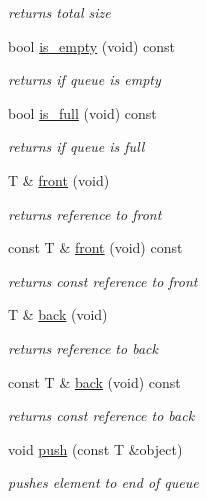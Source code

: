 \begin{DoxyCompactItemize}
\begin{DoxyCompactList}\small\item\em returns total size \end{DoxyCompactList}\item 
bool \hyperlink{classcrap_1_1static__queue_a6c20ede09aa3faca8849e97ec69b72b1}{is\-\_\-empty} (void) const 
\begin{DoxyCompactList}\small\item\em returns if queue is empty \end{DoxyCompactList}\item 
bool \hyperlink{classcrap_1_1static__queue_a4b27921670bf0540ab503043294b5c91}{is\-\_\-full} (void) const 
\begin{DoxyCompactList}\small\item\em returns if queue is full \end{DoxyCompactList}\item 
T \& \hyperlink{classcrap_1_1static__queue_ad2e008517715ad74b7d32aa3aa56f093}{front} (void)
\begin{DoxyCompactList}\small\item\em returns reference to front \end{DoxyCompactList}\item 
const T \& \hyperlink{classcrap_1_1static__queue_a74ad719cbd8afc785965e65a988e3440}{front} (void) const 
\begin{DoxyCompactList}\small\item\em returns const reference to front \end{DoxyCompactList}\item 
T \& \hyperlink{classcrap_1_1static__queue_a1ab208ae18b5188c6fe530bec2a39451}{back} (void)
\begin{DoxyCompactList}\small\item\em returns reference to back \end{DoxyCompactList}\item 
const T \& \hyperlink{classcrap_1_1static__queue_a153b42e76650c17a27673e5c4596f73b}{back} (void) const 
\begin{DoxyCompactList}\small\item\em returns const reference to back \end{DoxyCompactList}\item 
void \hyperlink{classcrap_1_1static__queue_a1a24079d7dcd7e43b45f6375bea1c8a5}{push} (const T \&object)
\begin{DoxyCompactList}\small\item\em pushes element to end of queue \end{DoxyCompactList}\item 

\end{DoxyCompactItemize}
